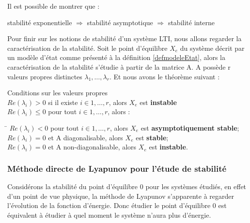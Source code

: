 \begin{rem}
	\label{remImplique}
Il est possible de montrer que :
\begin{center}
stabilité exponentielle $\Rightarrow$ stabilité asymptotique $\Rightarrow$ stabilité interne
\end{center}
\end{rem}

Pour finir sur les notions de stabilité d'un système LTI, nous allons regarder la caractérisation de la stabilité. Soit le point d'équilibre $X_e$ du système décrit par un modèle d'état comme présenté à la définition \ref{defmodeleEtat}, alors la caractérisation de la stabilité s'étudie à partir de la matrice A. A possède r valeurs propres distinctes $\lambda_1,\ldots,\lambda_r$. Et nous avons le théorème suivant : 
\begin{theo} Conditions sur les valeurs propres\\
$Re(\lambda_i) > 0$ si il existe $i \in 1,\ldots,r$, alors $X_e$ est \textbf{instable}\\
$Re(\lambda_i) \leq 0$ pour tout $i \in 1,\ldots,r$, alors :\\
\vspace{-1cm}
\begin{tabbing}
	\hspace{1cm}\=\kill
	\> $Re(\lambda_i) < 0$ pour tout $i \in 1,\ldots,r$, alors $X_e$ est \textbf{asymptotiquement stable};\\ 
	\> $Re(\lambda_i) = 0$ et A diagonalisable, alors $X_e$ est \textbf{stable};\\ 
	\> $Re(\lambda_i) = 0$ et A non-diagonalisable, alors $X_e$ est \textbf{instable}.
\end{tabbing} 
\end{theo}

\subsubsection{Méthode directe de Lyapunov pour l'étude de stabilité}
Considérons la stabilité du point d'équilibre 0 pour les systèmes étudiés, en effet d'un point de vue physique, la méthode de Lyapunov s'apparente à regarder l'évolution de la fonction d'énergie. Donc étudier le point d'équilibre 0 est équivalent à étudier à quel moment le système n'aura plus d'énergie. 

